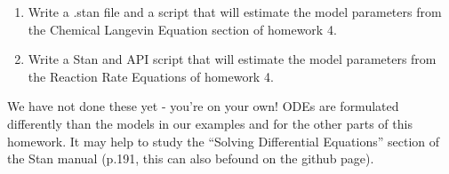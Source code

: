 \documentclass{article}\usepackage[]{graphicx}\usepackage[]{color}
\begin{document}
\begin{enumerate}
    \item Write a .stan file and a script that will estimate the model parameters from the Chemical Langevin Equation section of homework 4.
    \item Write a Stan and API script that will estimate the model parameters
      from the Reaction Rate Equations of homework 4.
\end{enumerate}

We have not done these yet - you're on your own! ODEs are formulated differently
than the models in our examples and for the other parts of this homework. It may
help to study the ``Solving Differential Equations'' section of the Stan manual (p.191, this can also befound on the github page).
\end{document}
